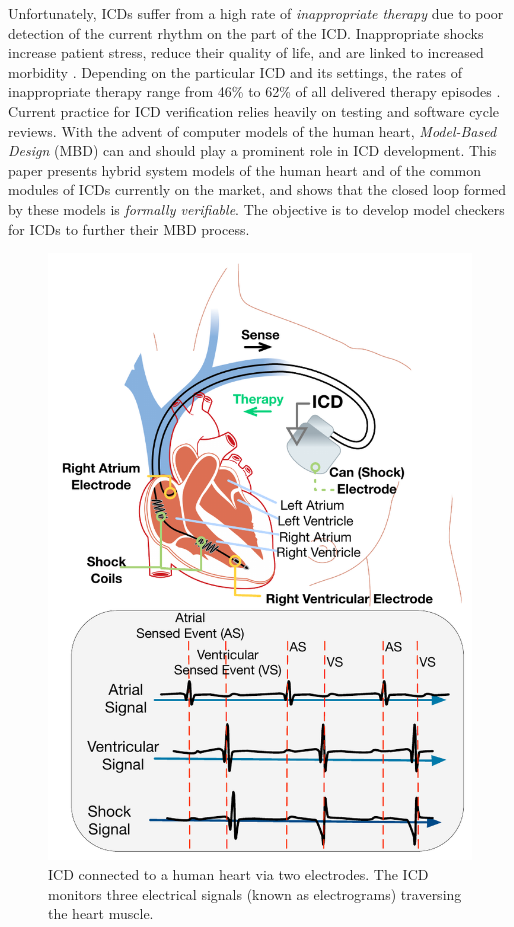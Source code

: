 Unfortunately, \acp{ICD} suffer from a high rate of \emph{inappropriate therapy} due to poor detection of the current rhythm on the part of the \ac{ICD}.
Inappropriate shocks increase patient stress, reduce their quality of life, and are linked to increased morbidity \cite{shock_mortality}.
Depending on the particular ICD and its settings, the rates of inappropriate therapy range from 46\% to 62\% of all delivered therapy episodes \cite{GoldABBTB11_RIGHTresults}.
Current practice for \ac{ICD} verification relies heavily on testing and software cycle reviews.
With the advent of computer models of the human heart, \emph{Model-Based Design} (MBD) can and should play a prominent role in \ac{ICD} development.
This paper presents hybrid system models of the human heart and of the common modules of \acp{ICD} currently on the market, and shows that the closed loop formed by these models is \emph{formally verifiable}.
The objective is to develop model checkers for \acp{ICD} to further their MBD process.
\begin{figure}[t]
	\centering
	\includegraphics[scale=0.3]{figures/figICD}
	\vspace{-10pt}
	\caption{\small ICD connected to a human heart via two electrodes. The ICD monitors three electrical signals (known as electrograms) traversing the heart muscle.}
	\label{fig:icd}
	\vspace{-10pt}
\end{figure}

